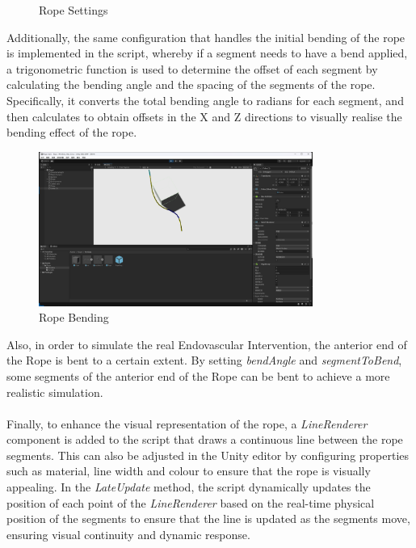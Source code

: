 \documentclass[12pt]{article}
\begin{document}
\begin{enumerate}
\begin{figure}[H]
            \caption{Rope Settings}
      \end{figure}
      Additionally, the same configuration that handles the initial bending of the rope is implemented in the script, whereby if a segment needs to have a bend applied, a trigonometric function is used to determine the offset of each segment by calculating the bending angle and the spacing of the segments of the rope. Specifically, it converts the total bending angle to radians for each segment, and then calculates to obtain offsets in the X and Z directions to visually realise the bending effect of the rope.
      \begin{figure}[H]
            \centering
            \includegraphics[width=0.8\textwidth]{React.png}
            \caption{Rope Bending}
      \end{figure}
      Also, in order to simulate the real Endovascular Intervention, the anterior end of the Rope is bent to a certain extent. By setting \emph{bendAngle} and \emph{segmentToBend}, some segments of the anterior end of the Rope can be bent to achieve a more realistic simulation.
      \\\\
      Finally, to enhance the visual representation of the rope, a \emph{LineRenderer} component is added to the script that draws a continuous line between the rope segments. This can also be adjusted in the Unity editor by configuring properties such as material, line width and colour to ensure that the rope is visually appealing. In the \emph{LateUpdate } method, the script dynamically updates the position of each point of the \emph{LineRenderer} based on the real-time physical position of the segments to ensure that the line is updated as the segments move, ensuring visual continuity and dynamic response.
      \begin{figure}[H]
            \centering

\end{figure}
\end{enumerate}
\end{document}
